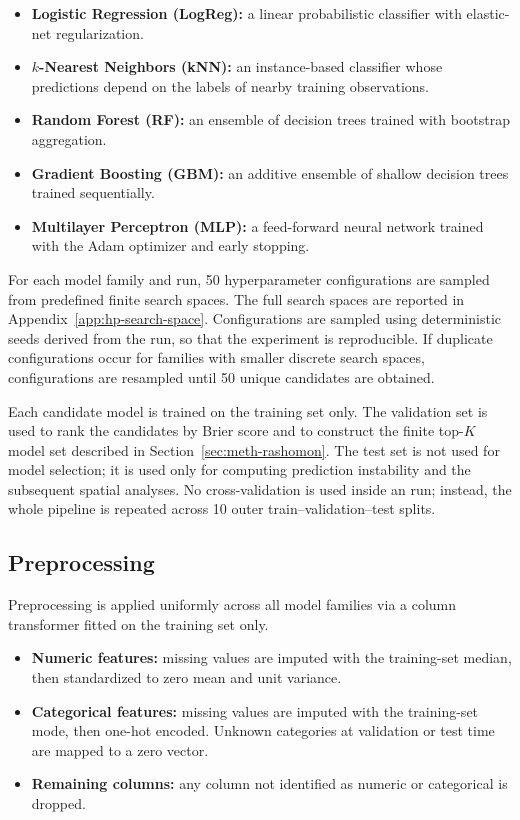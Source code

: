 \begin{itemize}
    \item \textbf{Logistic Regression (LogReg):} a linear probabilistic classifier with
    elastic-net regularization.

    \item \textbf{$k$-Nearest Neighbors (kNN):} an instance-based classifier whose
    predictions depend on the labels of nearby training observations.

    \item \textbf{Random Forest (RF):} an ensemble of decision trees trained with
    bootstrap aggregation.

    \item \textbf{Gradient Boosting (GBM):} an additive ensemble of shallow decision
    trees trained sequentially.

    \item \textbf{Multilayer Perceptron (MLP):} a feed-forward neural network trained
    with the Adam optimizer and early stopping.
\end{itemize}

For each model family and run, 50 hyperparameter configurations are sampled from
predefined finite search spaces. The full search spaces are reported in
Appendix~\ref{app:hp-search-space}. Configurations are sampled using deterministic seeds
derived from the run, so that the experiment is reproducible. If duplicate
configurations occur for families with smaller discrete search spaces, configurations are
resampled until 50 unique candidates are obtained.

Each candidate model is trained on the training set only. The validation set is used to
rank the candidates by Brier score and to construct the finite top-$K$ model set described
in Section~\ref{sec:meth-rashomon}. The test set is not used for model selection; it is
used only for computing prediction instability and the subsequent spatial analyses. No
cross-validation is used inside an run; instead, the whole pipeline is repeated across
10 outer train--validation--test splits.

\subsection{Preprocessing}
\label{sec:exp-preproc}

Preprocessing is applied uniformly across all model families via a column transformer fitted
on the training set only.

\begin{itemize}
  \item \textbf{Numeric features:} missing values are imputed with the training-set median, then standardized to zero mean and unit variance.
  \item \textbf{Categorical features:} missing values are imputed with the training-set mode, then one-hot encoded. Unknown categories at validation or test time are mapped to a zero vector.
  \item \textbf{Remaining columns:} any column not identified as numeric or categorical is dropped.
\end{itemize}

